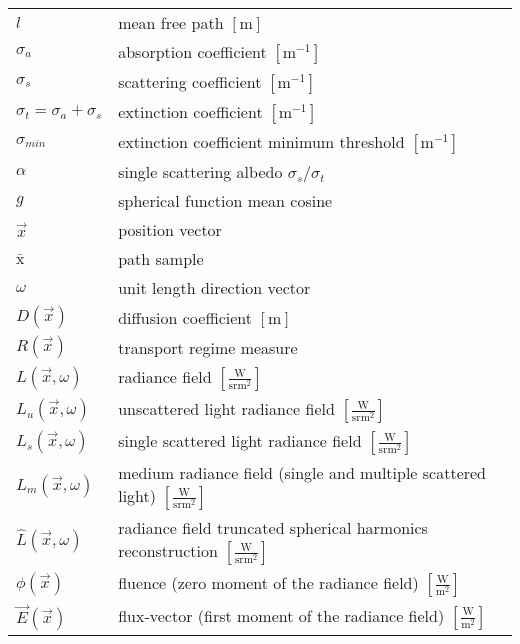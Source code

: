 \begin{flushleft}
\renewcommand*{\arraystretch}{1.75}
\begin{longtable}[c]{@{}p{28.5mm}@{} p{120.5mm}}
	$l$	&  mean free path $\left[\si{\meter}\right]$\\
	$\sigma_a$	&  absorption coefficient $\left[\si{\meter}^{-1}\right]$
	\\
	$\sigma_s$	&  scattering coefficient $\left[\si{\meter}^{-1}\right]$
	\\
	$\sigma_t=\sigma_a+\sigma_s$	&  extinction coefficient $\left[\si{\meter}^{-1}\right]$
	\\
	$\sigma_{min}$	&  extinction coefficient minimum threshold $\left[\si{\meter}^{-1}\right]$
	\\
	$\alpha$	&  single scattering albedo $\sigma_s/\sigma_t$
	\\
	$g$	&  spherical function mean cosine
	\\
	$\vec{x}$	&  position vector
	\\
	$\bar{\mathrm{x}}$	&  path sample
	\\
	$\omega$	&  unit length direction vector
	\\
	$D\left(\vec{x}\right)$	&  diffusion coefficient $\left[\si{\meter}\right]$
	\\
	$R\left(\vec{x}\right)$	&  transport regime measure
	\\
	$L\left(\vec{x}, \omega\right)$	&  radiance field $\left[\frac{\si{\watt}}{\si{\steradian} \si{\meter}^2}\right]$
	\\
	$L_u\left(\vec{x}, \omega\right)$	&  unscattered light radiance field $\left[\frac{\si{\watt}}{\si{\steradian} \si{\meter}^2}\right]$
	\\
	$L_s\left(\vec{x}, \omega\right)$	&  single scattered light radiance field $\left[\frac{\si{\watt}}{\si{\steradian} \si{\meter}^2}\right]$
	\\
	$L_m\left(\vec{x}, \omega\right)$	&  medium radiance field (single and multiple scattered light) $\left[\frac{\si{\watt}}{\si{\steradian} \si{\meter}^2}\right]$
	\\
	$\widehat{L}\left(\vec{x}, \omega\right)$	&  radiance field truncated spherical harmonics reconstruction $\left[\frac{\si{\watt}}{\si{\steradian} \si{\meter}^2}\right]$
	\\
	$\phi\left(\vec{x}\right)$	&  fluence (zero moment of the radiance field) $\left[\frac{\si{\watt}}{\si{\meter}^2}\right]$
	\\
	$\vec{E}\left(\vec{x}\right)$	&  flux-vector (first moment of the radiance field) $\left[\frac{\si{\watt}}{\si{\meter}^2}\right]$

\end{longtable}
\end{flushleft}
